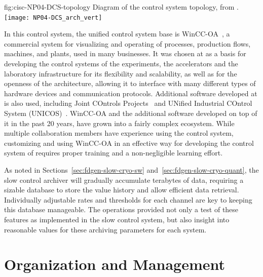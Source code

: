 \begin{dunefigure}{fig:cisc-NP04-DCS-topology}
{Diagram of the  control system topology, from \cite{pdspdcs_proc}.}
\texttt{[image: NP04-DCS\_arch\_vert]}
\end{dunefigure}

In this control system, the unified control system base is WinCC-OA~\cite{winccoa}, a commercial  system for visualizing and operating of processes, production flows, machines, and plants, used
in many businesses. It was chosen at  as a basis for
developing the control systems of the  experiments, the
accelerators and the laboratory infrastructure for its flexibility and
scalability, as well as for the openness of the architecture, allowing
it to interface with many different types of hardware devices and
communication protocols. Additional software developed at 
is also used, including Joint COntrols Projects~\cite{jcop} and UNified
Industrial COntrol System (UNICOS)~\cite{unicos}. WinCC-OA and the
additional software developed on top of it in the past 20 years, have
grown into a fairly complex ecosystem. While multiple collaboration
members have experience using the  control system,
customizing and using WinCC-OA in an effective way for developing the
control system of  requires proper training and a
non-negligible learning effort.

As noted in Sections~\ref{sec:fdgen-slow-cryo-sw} and~\ref{sec:fdgen-slow-cryo-quant},
the slow control archiver will gradually accumulate terabytes of
data, requiring a sizable database to store the value history and
allow efficient data retrieval. Individually adjustable rates and
thresholds for each channel are key to keeping this database
manageable. The  operations provided not only a test of
these features as implemented in the  slow control system, but also insight into
reasonable values for these archiving parameters for each system.


\section{Organization and Management}
\label{sec:cisc-slow-controls-org}


